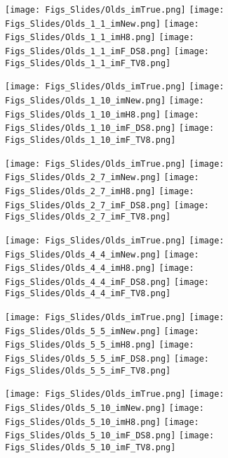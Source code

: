 		\begin{figure}
		\centering
		
		\texttt{[image: Figs\_Slides/Olds\_imTrue.png]}
		\texttt{[image: Figs\_Slides/Olds\_1\_1\_imNew.png]}
		\texttt{[image: Figs\_Slides/Olds\_1\_1\_imH8.png]}
		\texttt{[image: Figs\_Slides/Olds\_1\_1\_imF\_DS8.png]}
		\texttt{[image: Figs\_Slides/Olds\_1\_1\_imF\_TV8.png]}
		
		\texttt{[image: Figs\_Slides/Olds\_imTrue.png]}
		\texttt{[image: Figs\_Slides/Olds\_1\_10\_imNew.png]}
		\texttt{[image: Figs\_Slides/Olds\_1\_10\_imH8.png]}
		\texttt{[image: Figs\_Slides/Olds\_1\_10\_imF\_DS8.png]}
		\texttt{[image: Figs\_Slides/Olds\_1\_10\_imF\_TV8.png]}
		
		\texttt{[image: Figs\_Slides/Olds\_imTrue.png]}
		\texttt{[image: Figs\_Slides/Olds\_2\_7\_imNew.png]}
		\texttt{[image: Figs\_Slides/Olds\_2\_7\_imH8.png]}
		\texttt{[image: Figs\_Slides/Olds\_2\_7\_imF\_DS8.png]}
		\texttt{[image: Figs\_Slides/Olds\_2\_7\_imF\_TV8.png]}
				
		\texttt{[image: Figs\_Slides/Olds\_imTrue.png]}
		\texttt{[image: Figs\_Slides/Olds\_4\_4\_imNew.png]}
		\texttt{[image: Figs\_Slides/Olds\_4\_4\_imH8.png]}
		\texttt{[image: Figs\_Slides/Olds\_4\_4\_imF\_DS8.png]}
		\texttt{[image: Figs\_Slides/Olds\_4\_4\_imF\_TV8.png]}
						
		\texttt{[image: Figs\_Slides/Olds\_imTrue.png]}
		\texttt{[image: Figs\_Slides/Olds\_5\_5\_imNew.png]}
		\texttt{[image: Figs\_Slides/Olds\_5\_5\_imH8.png]}
		\texttt{[image: Figs\_Slides/Olds\_5\_5\_imF\_DS8.png]}
		\texttt{[image: Figs\_Slides/Olds\_5\_5\_imF\_TV8.png]}
								
        \texttt{[image: Figs\_Slides/Olds\_imTrue.png]}
		\texttt{[image: Figs\_Slides/Olds\_5\_10\_imNew.png]}
		\texttt{[image: Figs\_Slides/Olds\_5\_10\_imH8.png]}
		\texttt{[image: Figs\_Slides/Olds\_5\_10\_imF\_DS8.png]}
		\texttt{[image: Figs\_Slides/Olds\_5\_10\_imF\_TV8.png]}
										

\end{figure}
